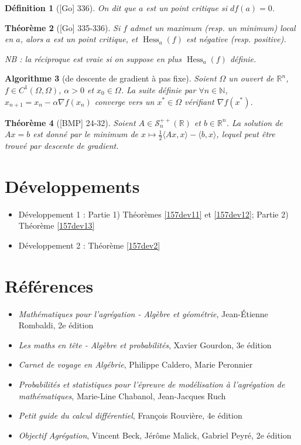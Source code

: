 \documentclass[10pt, a4paper, parskip=full, twoside, twocolumn]{report}
\newtheorem{definition}{Définition}
\newtheorem{theorem}[definition]{Théorème}
\newtheorem{algorithm}[definition]{Algorithme}
\newcommand{\IN}{\mathbb{N}}
\newcommand{\IR}{\mathbb{R}}
\DeclareMathOperator{\Hess}{Hess}
\begin{document}
\begin{definition}[\textnormal{[Go] 336}]
	On dit que $a$ est un \emph{point critique} si $df(a)=0$.
\end{definition}

\begin{theorem}[\textnormal{[Go] 335-336}]
	Si $f$ admet un maximum (resp. un minimum) local en $a$, alors $a$ est un point critique, et $\Hess_a(f)$ est négative (resp. positive).

	NB : la réciproque est vraie si on suppose en plus $\Hess_a(f)$ définie.
\end{theorem}

\begin{algorithm}[de descente de gradient à pas fixe]
	Soient $\Omega$ un ouvert de $\IR^n$, $f\in C^1(\Omega, \Omega)$, $\alpha > 0$ et $x_0\in\Omega$.
	La suite définie par $\forall n\in\IN$, $x_{n+1} = x_n - \alpha\nabla f(x_n)$ converge vers un $x^*\in\Omega$ vérifiant $\nabla f(x^*)$.
\end{algorithm}

\begin{theorem}[\textnormal{[BMP] 24-32}]
	Soient $A\in\mathcal{S}_n^{++}(\IR)$ et $b\in\IR^n$.
	La solution de $Ax=b$ est donné par le minimum de $x\mapsto \frac{1}{2}\langle Ax, x\rangle - \langle b,x\rangle$, lequel peut être trouvé par descente de gradient.
\end{theorem}



\section*{Développements}
\begin{itemize}
	\item Développement 1 : Partie 1) Théorèmes \ref{157dev11} et \ref{157dev12}; Partie 2) Théorème \ref{157dev13}
	\item Développement 2 : Théorème \ref{157dev2}
\end{itemize}

\section*{Références}
\begin{itemize}
	\item[R] \emph{Mathématiques pour l'agrégation - Algèbre et géométrie}, Jean-Étienne Rombaldi, 2e édition
	\item[Go] \emph{Les maths en tête - Algèbre et probabilités}, Xavier Gourdon, 3e édition
	\item[C] \emph{Carnet de voyage en Algébrie}, Philippe Caldero, Marie Peronnier
	\item[CR] \emph{Probabilités et statistiques pour l'épreuve de modélisation à l'agrégation de mathématiques}, Marie-Line Chabanol, Jean-Jacques Ruch
	\item[Rv] \emph{Petit guide du calcul différentiel}, François Rouvière, 4e édition
	\item[BMP] \emph{Objectif Agrégation}, Vincent Beck, Jérôme Malick, Gabriel Peyré, 2e édition
\end{itemize}
\end{document}

